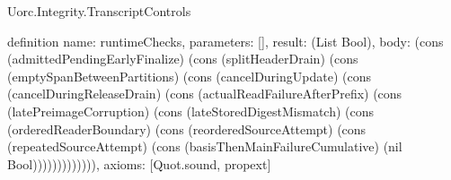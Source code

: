 \begin{lexlean}{Uorc.Integrity.TranscriptControls}
\begin{semanticmodule}
definition{
  name: runtimeChecks,
  parameters: [],
  result: (List Bool),
  body: (cons (admittedPendingEarlyFinalize) (cons (splitHeaderDrain) (cons (emptySpanBetweenPartitions) (cons (cancelDuringUpdate) (cons (cancelDuringReleaseDrain) (cons (actualReadFailureAfterPrefix) (cons (latePreimageCorruption) (cons (lateStoredDigestMismatch) (cons (orderedReaderBoundary) (cons (reorderedSourceAttempt) (cons (repeatedSourceAttempt) (cons (basisThenMainFailureCumulative) (nil Bool))))))))))))),
  axioms: [Quot.sound, propext]
}
\end{semanticmodule}
\end{lexlean}
